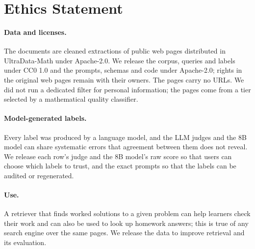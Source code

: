 \section*{Ethics Statement}

\paragraph{Data and licenses.} The documents are cleaned extractions of public web pages distributed in UltraData-Math under Apache-2.0. We release the corpus, queries and labels under CC0 1.0 and the prompts, schemas and code under Apache-2.0; rights in the original web pages remain with their owners. The pages carry no URLs. We did not run a dedicated filter for personal information; the pages come from a tier selected by a mathematical quality classifier.

\paragraph{Model-generated labels.} Every label was produced by a language model, and the LLM judges and the 8B model can share systematic errors that agreement between them does not reveal. We release each row's judge and the 8B model's raw score so that users can choose which labels to trust, and the exact prompts so that the labels can be audited or regenerated.

\paragraph{Use.} A retriever that finds worked solutions to a given problem can help learners check their work and can also be used to look up homework answers; this is true of any search engine over the same pages. We release the data to improve retrieval and its evaluation.
